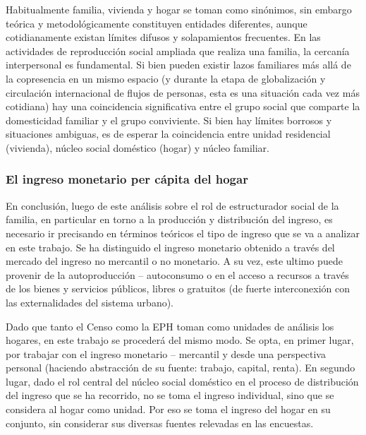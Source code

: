 Habitualmente familia, vivienda y hogar se toman como sinónimos, sin embargo teórica y metodológicamente constituyen entidades diferentes, aunque cotidianamente existan límites difusos y solapamientos frecuentes. En las actividades de reproducción social ampliada que realiza una familia, la cercanía interpersonal es fundamental. Si bien pueden existir lazos familiares más allá de la copresencia en un mismo espacio (y durante la etapa de globalización y circulación internacional de flujos de personas, esta es una situación cada vez más cotidiana) hay una coincidencia significativa entre el grupo social que comparte la domesticidad familiar y el grupo conviviente. Si bien hay límites borrosos y situaciones ambiguas, es de esperar la coincidencia entre unidad residencial (vivienda), núcleo social doméstico (hogar) y núcleo familiar. 
	
\subsubsection{El ingreso monetario per cápita del hogar}	
	
En conclusión, luego de este análisis sobre el rol de estructurador social de la familia, en particular en torno a la producción y distribución del ingreso, es necesario ir precisando en términos teóricos el tipo de ingreso que se va a analizar en este trabajo. Se ha distinguido el ingreso monetario obtenido a través del mercado del ingreso no mercantil o no monetario. A su vez, este ultimo puede provenir de la autoproducción – autoconsumo o en el acceso a recursos a través de los bienes y servicios públicos, libres o gratuitos (de fuerte interconexión con las externalidades del sistema urbano).
	
Dado que tanto el Censo como la EPH toman como unidades de análisis los hogares, en este trabajo se procederá del mismo modo. Se opta, en primer lugar, por trabajar con el ingreso monetario – mercantil y desde una perspectiva personal (haciendo abstracción de su fuente: trabajo, capital, renta). En segundo lugar, dado el rol central del núcleo social doméstico en el proceso de distribución del ingreso que se ha recorrido, no se toma el ingreso individual, sino que se considera al hogar como unidad. Por eso se toma el ingreso del hogar en su conjunto, sin considerar sus diversas fuentes relevadas en las encuestas.
	
